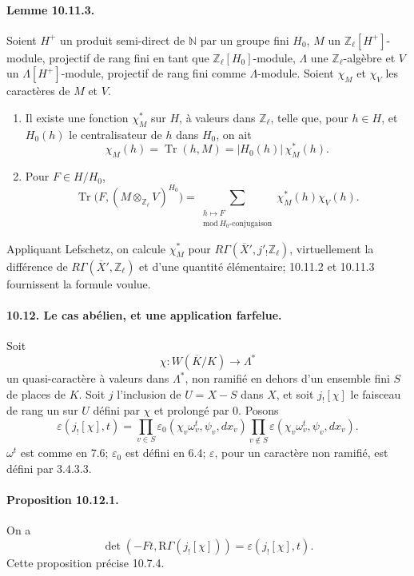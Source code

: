 \documentclass[10pt]{article}
\newcommand{\Z}{\mathbb Z}
\newcommand{\Tr}{\operatorname{Tr}}
\providecommand{\Tr}{\operatorname{Tr}}
\providecommand{\Tr}{\operatorname{Tr}}
\providecommand{\RGamma}{\mathrm R\Gamma}
\providecommand{\Tr}{\operatorname{Tr}}
\begin{document}
\paragraph{Lemme 10.11.3.} Soient \(H^+\) un produit semi-direct de \(\mathbb N\) par un groupe fini \(H_0\), \(M\) un \(\Z_\ell[H^+]\)-module, projectif de rang fini en tant que \(\Z_\ell[H_0]\)-module, \(\Lambda\) une \(\Z_\ell\)-algèbre et \(V\) un \(\Lambda[H^+]\)-module, projectif de rang fini comme \(\Lambda\)-module. Soient \(\chi_M\) et \(\chi_V\) les caractères de \(M\) et \(V\).
\begin{enumerate}[label=(\roman*)]
\item Il existe une fonction \(\chi_M^*\) sur \(H\), à valeurs dans \(\Z_\ell\), telle que, pour \(h\in H\), et \(H_0(h)\) le centralisateur de \(h\) dans \(H_0\), on ait
\[
\chi_M(h)=\Tr(h,M)=|H_0(h)|\,\chi_M^*(h).
\]
\item Pour \(F\in H/H_0\),
\[
\Tr\bigl(F,(M\otimes_{\Z_\ell}V)^{H_0}\bigr)
=
\sum_{\substack{h\mapsto F\\ \mathrm{mod}\ H_0\text{-conjugaison}}}
\chi_M^*(h)\chi_V(h).
\]
\end{enumerate}

Appliquant Lefschetz, on calcule \(\chi_M^*\) pour \(R\Gamma(\overline X',j'_!\Z_\ell)\), virtuellement la différence de \(R\Gamma(\overline X',\Z_\ell)\) et d'une quantité élémentaire; 10.11.2 et 10.11.3 fournissent la formule voulue.




\paragraph{10.12. Le cas abélien, et une application farfelue.} Soit
\[
\chi:W(\overline K/K)\longrightarrow \Lambda^*
\]
un quasi-caractère à valeurs dans \(\Lambda^*\), non ramifié en dehors d'un ensemble fini \(S\) de places de \(K\). Soit \(j\) l'inclusion de \(U=X-S\) dans \(X\), et soit \(j_![\chi]\) le faisceau de rang un sur \(U\) défini par \(\chi\) et prolongé par \(0\). Posons
\[
\varepsilon(j_![\chi],t)=
\prod_{v\in S}\varepsilon_0(\chi_v\omega_v^t,\psi_v,dx_v)
\prod_{v\notin S}\varepsilon(\chi_v\omega_v^t,\psi_v,dx_v).
\]
\(\omega^t\) est comme en 7.6; \(\varepsilon_0\) est défini en 6.4; \(\varepsilon\), pour un caractère non ramifié, est défini par 3.4.3.3.

\paragraph{Proposition 10.12.1.} On a
\[
\det(-Ft,\RGamma(j_![\chi]))=\varepsilon(j_![\chi],t).
\]
Cette proposition précise 10.7.4.
\end{document}
